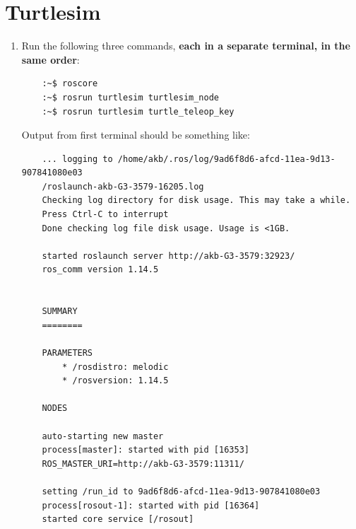 \documentclass{article}
\begin{document}
    \section{Turtlesim}
    \begin{enumerate}
        \item Run the following three commands, \textbf{each in a separate terminal, in the same order}:
        \begin{verbatim}
    :~$ roscore
    :~$ rosrun turtlesim turtlesim_node
    :~$ rosrun turtlesim turtle_teleop_key 
        \end{verbatim}
        Output from first terminal should be something like:
        \begin{verbatim}
    ... logging to /home/akb/.ros/log/9ad6f8d6-afcd-11ea-9d13-907841080e03
    /roslaunch-akb-G3-3579-16205.log
    Checking log directory for disk usage. This may take a while.
    Press Ctrl-C to interrupt
    Done checking log file disk usage. Usage is <1GB.
    
    started roslaunch server http://akb-G3-3579:32923/
    ros_comm version 1.14.5
    
    
    SUMMARY
    ========
    
    PARAMETERS
        * /rosdistro: melodic
        * /rosversion: 1.14.5
    
    NODES
    
    auto-starting new master
    process[master]: started with pid [16353]
    ROS_MASTER_URI=http://akb-G3-3579:11311/
    
    setting /run_id to 9ad6f8d6-afcd-11ea-9d13-907841080e03
    process[rosout-1]: started with pid [16364]
    started core service [/rosout]
        \end{verbatim}


\end{enumerate}
\end{document}
